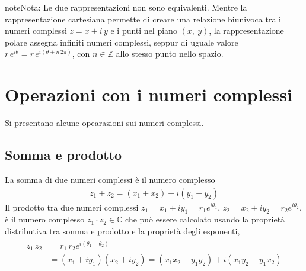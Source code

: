 \documentclass[letterpaper,10pt,italian]{jupyterBook}
\begin{document}
\begin{sphinxadmonition}{note}{Nota:}
\sphinxAtStartPar
Le due rappresentazioni non sono equivalenti. Mentre la rappresentazione cartesiana permette di creare una relazione biunivoca tra i numeri complessi \(z = x + i \, y\) e i punti nel piano \((x, \ y)\), la rappresentazione polare assegna infiniti numeri complessi, seppur di uguale valore \(r \, e^{i \theta} = r \, e^{i (\theta + n \, 2 \pi)}\), con \(n \in \mathbb{Z}\) allo stesso punto nello spazio.
\end{sphinxadmonition}


\section{Operazioni con i numeri complessi}
\label{\detokenize{ch/algebra/complex-algebra:operazioni-con-i-numeri-complessi}}\label{\detokenize{ch/algebra/complex-algebra:math-hs-algebra-complex-operations}}
\sphinxAtStartPar
Si presentano alcune opearazioni sui numeri complessi.


\subsection{Somma e prodotto}
\label{\detokenize{ch/algebra/complex-algebra:somma-e-prodotto}}
\sphinxAtStartPar
{} La somma di due numeri complessi è il numero complesso
\begin{equation*}
\begin{split}z_1 + z_2 = (x_1 + x_2) + i(y_1 + y_2)\end{split}
\end{equation*}
\sphinxAtStartPar
{} Il prodotto tra due numeri complessi \(z_1 = x_1 + i y_1 = r_1 e^{i \theta_1}\), \(z_2 = x_2 + i y_2 = r_2 e^{i \theta_2}\), è il numero complesso \(z_1 \cdot z_2 \in \mathbb{C}\) che può essere calcolato usando la proprietà distributiva tra somma e prodotto e la proprietà degli esponenti,
\begin{equation*}
\begin{split}\begin{aligned}
    z_1 \, z_2 
    & = r_1 \, r_2 e^{i(\theta_1 + \theta_2)} = \\
    & = (x_1 + i y_1 ) (x_2 + i y_2) = (x_1 x_2 - y_1 y_2)+i(x_1 y_2 + y_1 x_2) \\
  \end{aligned}\end{split}
\end{equation*}
\end{document}
